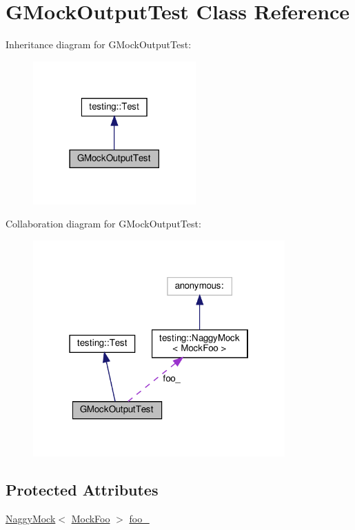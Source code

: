 \hypertarget{class_g_mock_output_test}{}\section{G\+Mock\+Output\+Test Class Reference}
\label{class_g_mock_output_test}


Inheritance diagram for G\+Mock\+Output\+Test\+:
\nopagebreak
\begin{figure}[H]
\begin{center}
\leavevmode
\includegraphics[width=177pt]{class_g_mock_output_test__inherit__graph}
\end{center}
\end{figure}


Collaboration diagram for G\+Mock\+Output\+Test\+:
\nopagebreak
\begin{figure}[H]
\begin{center}
\leavevmode
\includegraphics[width=274pt]{class_g_mock_output_test__coll__graph}
\end{center}
\end{figure}
\subsection*{Protected Attributes}
\begin{DoxyCompactItemize}
\item 
\hyperlink{classtesting_1_1_naggy_mock}{Naggy\+Mock}$<$ \hyperlink{class_mock_foo}{Mock\+Foo} $>$ \hyperlink{class_g_mock_output_test_aed97d2ca515d69466968c60575cc18a2}{foo\+\_\+}
\end{DoxyCompactItemize}
